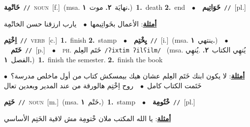 \documentclass[10pt,a4paper,twoside]{article} %
\begin{document}
\begin{multicols}{2}
{{{\setlength\topsep{0pt}\textbf{\foreignlanguage{arabic}{خَاتْمِة}}\ {\color{gray}\texttt{//}\color{black}}\ \textsc{noun}\ [f.]\ \color{gray}(msa. \foreignlanguage{arabic}{نهايَة}~\foreignlanguage{arabic}{\textbf{٢.}}  \foreignlanguage{arabic}{موت}~\foreignlanguage{arabic}{\textbf{١.}})\color{black}\ \textbf{1.}~death  \textbf{2.}~end\ \ $\bullet$\ \ \setlength\topsep{0pt}\textbf{\foreignlanguage{arabic}{خَوَاتِيم}}\ {\color{gray}\texttt{//}\color{black}}\ [pl.]\  \begin{flushright}\color{gray}\foreignlanguage{arabic}{\textbf{\underline{\foreignlanguage{arabic}{أمثلة}}}: الأعمال بخَواتِيمها\ $\bullet$\ \  يارب ارزقنا حسن الخاتْمِة}\end{flushright}\color{black}} \vspace{2mm}

{\setlength\topsep{0pt}\textbf{\foreignlanguage{arabic}{اِخْتِم}}\ {\color{gray}\texttt{//}\color{black}}\ \textsc{verb}\ [c.]\ \textbf{1.}~finish  \textbf{2.}~stamp\ \ $\bullet$\ \ \setlength\topsep{0pt}\textbf{\foreignlanguage{arabic}{يِخْتِم}}\ {\color{gray}\texttt{//}\color{black}}\ [i.]\ \color{gray}(msa. \foreignlanguage{arabic}{ينتهي}~\foreignlanguage{arabic}{\textbf{١.}})\color{black}\ \ $\bullet$\ \ \setlength\topsep{0pt}\textbf{\foreignlanguage{arabic}{خَتَم}}\ {\color{gray}\texttt{//}\color{black}}\ [p.]\ \ $\bullet$\ \ \textsc{ph.} \color{gray} \foreignlanguage{arabic}{خَتَم العِلم}\color{black}\ {\color{gray}\texttt{/{\sffamily ʔixtim ʔilʕilm}/}\color{black}}\ \color{gray} (msa. \foreignlanguage{arabic}{يُنهِي الكتاب}~\foreignlanguage{arabic}{\textbf{٢.}}  .\foreignlanguage{arabic}{يُنهِي الفصل}~\foreignlanguage{arabic}{\textbf{١.}})\color{black}\ \textbf{1.}~finish the semester.  \textbf{2.}~finish the book\  \begin{flushright}\color{gray}\foreignlanguage{arabic}{\textbf{\underline{\foreignlanguage{arabic}{أمثلة}}}: لا يكون ابنك خَتَم العِلم عشان هيك بيمسكش كتاب من أول ماخلص مدرسة؟\ $\bullet$\ \  خَتَمت الكتاب كامل\ $\bullet$\ \  روح اِخْتِم هالورقة من عند المدير وبعدين تعال}\end{flushright}\color{black}} \vspace{2mm}

{\setlength\topsep{0pt}\textbf{\foreignlanguage{arabic}{خَتِم}}\ {\color{gray}\texttt{//}\color{black}}\ \textsc{noun}\ [m.]\ \color{gray}(msa. \foreignlanguage{arabic}{خَتْم}~\foreignlanguage{arabic}{\textbf{١.}})\color{black}\ \textbf{1.}~stamp\ \ $\bullet$\ \ \setlength\topsep{0pt}\textbf{\foreignlanguage{arabic}{خْتُومِة}}\ {\color{gray}\texttt{//}\color{black}}\ [pl.]\  \begin{flushright}\color{gray}\foreignlanguage{arabic}{\textbf{\underline{\foreignlanguage{arabic}{أمثلة}}}: يا الله المكتب ملان خْتومِة مش لاقية الخَتِم الأساسي}\end{flushright}\color{black}} \vspace{2mm}

}}
\end{multicols}
\end{document}
